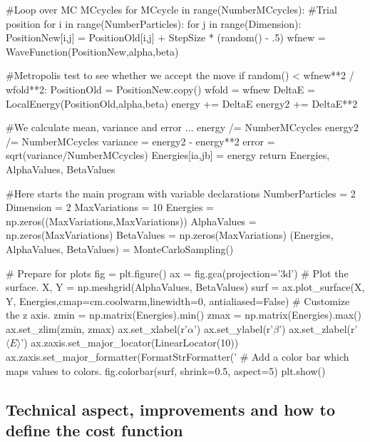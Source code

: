 \documentclass[%
oneside,                 %
final,                   %
10pt]{article}
\begin{document}
            #Loop over MC MCcycles
            for MCcycle in range(NumberMCcycles):
                #Trial position
                for i in range(NumberParticles):
                    for j in range(Dimension):
                        PositionNew[i,j] = PositionOld[i,j] + StepSize * (random() - .5)
                wfnew = WaveFunction(PositionNew,alpha,beta)

                #Metropolis test to see whether we accept the move
                if random() < wfnew**2 / wfold**2:
                   PositionOld = PositionNew.copy()
                   wfold = wfnew
                   DeltaE = LocalEnergy(PositionOld,alpha,beta)
                energy += DeltaE
                energy2 += DeltaE**2

            #We calculate mean, variance and error ...
            energy /= NumberMCcycles
            energy2 /= NumberMCcycles
            variance = energy2 - energy**2
            error = sqrt(variance/NumberMCcycles)
            Energies[ia,jb] = energy    
    return Energies, AlphaValues, BetaValues


#Here starts the main program with variable declarations
NumberParticles = 2
Dimension = 2
MaxVariations = 10
Energies = np.zeros((MaxVariations,MaxVariations))
AlphaValues = np.zeros(MaxVariations)
BetaValues = np.zeros(MaxVariations)
(Energies, AlphaValues, BetaValues) = MonteCarloSampling()

# Prepare for plots
fig = plt.figure()
ax = fig.gca(projection='3d')
# Plot the surface.
X, Y = np.meshgrid(AlphaValues, BetaValues)
surf = ax.plot_surface(X, Y, Energies,cmap=cm.coolwarm,linewidth=0, antialiased=False)
# Customize the z axis.
zmin = np.matrix(Energies).min()
zmax = np.matrix(Energies).max()
ax.set_zlim(zmin, zmax)
ax.set_xlabel(r'$\alpha$')
ax.set_ylabel(r'$\beta$')
ax.set_zlabel(r'$\langle E \rangle$')
ax.zaxis.set_major_locator(LinearLocator(10))
ax.zaxis.set_major_formatter(FormatStrFormatter('%
# Add a color bar which maps values to colors.
fig.colorbar(surf, shrink=0.5, aspect=5)
plt.show()

\epycod


\subsection{Technical aspect, improvements and how to define the cost function}

\paragraph{}
\end{document}
